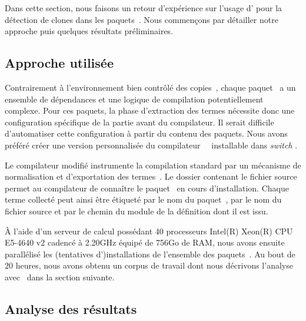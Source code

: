 
Dans cette section, nous faisons un retour d'expérience sur l'usage
d'{\Asak} pour la détection de clones dans les paquets~\Opam. Nous
commençons par détailler notre approche puis quelques résultats
préliminaires.


\subsection{Approche utilisée}

Contrairement à l'environnement bien contrôlé des
copies~{\LearnOCaml}, chaque paquet~{\Opam} a un ensemble de
dépendances et une logique de compilation potentiellement complexe.
Pour ces paquets, la phase d'extraction des termes {\LambdaCode}
nécessite donc une configuration spécifique de la partie avant du
compilateur. Il serait difficile d'automatiser cette configuration à
partir du contenu des paquets. Nous avons préféré créer une version
personnalisée du compilateur~{\OCaml}~\cite{custom-ocaml} installable
dans \textit{switch} {\Opam}.

Le compilateur modifié instrumente la compilation standard par un
mécanisme de normalisation et d'exportation des termes~{\LambdaCode}.
Le dossier contenant le fichier source permet au compilateur de connaître le
paquet~{\Opam} en cours d'installation. Chaque terme collecté peut
ainsi être étiqueté par le nom du paquet~\Opam, par le nom du fichier
source et par le chemin du module de la définition dont il est issu.

À l'aide d'un serveur de calcul possédant 40 processeurs Intel(R)
Xeon(R) CPU E5-4640 v2 cadencé à 2.20GHz équipé de 756Go de RAM, nous
avons ensuite parallélisé les (tentatives d')installations de
l'ensemble des paquets~\Opam. Au bout de~$20$ heures, nous avons
obtenu un corpus de travail dont nous décrivons l'analyse avec~{\Asak} dans
la section suivante.

\subsection{Analyse des résultats}

